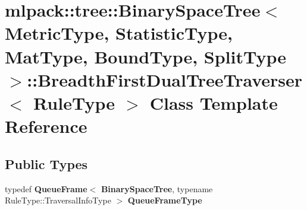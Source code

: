 \section{mlpack\+:\+:tree\+:\+:Binary\+Space\+Tree$<$ Metric\+Type, Statistic\+Type, Mat\+Type, Bound\+Type, Split\+Type $>$\+:\+:Breadth\+First\+Dual\+Tree\+Traverser$<$ Rule\+Type $>$ Class Template Reference}
\label{classmlpack_1_1tree_1_1BinarySpaceTree_1_1BreadthFirstDualTreeTraverser}
\subsection*{Public Types}
\begin{DoxyCompactItemize}
\item 
typedef {\bf Queue\+Frame}$<$ {\bf Binary\+Space\+Tree}, typename Rule\+Type\+::\+Traversal\+Info\+Type $>$ {\bf Queue\+Frame\+Type}
\end{DoxyCompactItemize}
